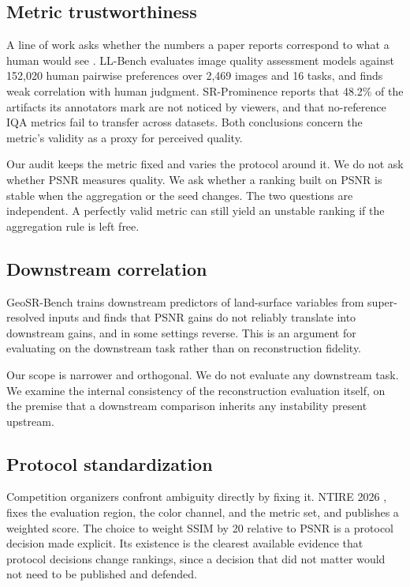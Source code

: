\documentclass{interact}
\begin{document}
\subsection{Metric trustworthiness}\label{sec:metric}

A line of work asks whether the numbers a paper reports correspond to what a human would see \citep{wang2004,blau2018}. LL-Bench \citep{liu2026a} evaluates image quality assessment models against 152,020 human pairwise preferences over 2,469 images and 16 tasks, and finds weak correlation with human judgment. SR-Prominence \citep{molodetskikh2026} reports that 48.2\% of the artifacts its annotators mark are not noticed by viewers, and that no-reference IQA metrics fail to transfer across datasets. Both conclusions concern the metric's validity as a proxy for perceived quality.

Our audit keeps the metric fixed and varies the protocol around it. We do not ask whether PSNR measures quality. We ask whether a ranking built on PSNR is stable when the aggregation or the seed changes. The two questions are independent. A perfectly valid metric can still yield an unstable ranking if the aggregation rule is left free.

\subsection{Downstream correlation}\label{sec:downstream}

GeoSR-Bench \citep{li2026} trains downstream predictors of land-surface variables from super-resolved inputs and finds that PSNR gains do not reliably translate into downstream gains, and in some settings reverse. This is an argument for evaluating on the downstream task rather than on reconstruction fidelity.

Our scope is narrower and orthogonal. We do not evaluate any downstream task. We examine the internal consistency of the reconstruction evaluation itself, on the premise that a downstream comparison inherits any instability present upstream.

\subsection{Protocol standardization}\label{sec:standard}

Competition organizers confront ambiguity directly by fixing it. NTIRE 2026 \citep{chen2026}, \citep{liu2026b} fixes the evaluation region, the color channel, and the metric set, and publishes a weighted score. The choice to weight SSIM by 20 relative to PSNR is a protocol decision made explicit. Its existence is the clearest available evidence that protocol decisions change rankings, since a decision that did not matter would not need to be published and defended.
\end{document}
